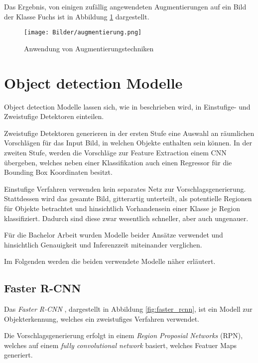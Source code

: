 Das Ergebnis, von einigen zufällig angewendeten Augmentierungen 
auf ein Bild der Klasse Fuchs ist in 
Abbildung \ref{fig:augmentierung} dargestellt.


\begin{figure}[H]
    \centering
    \texttt{[image: Bilder/augmentierung.png]}
    \caption{Anwendung von Augmentierungstechniken}
    \label{fig:augmentierung}
\end{figure}


\section{Object detection Modelle}

Object detection Modelle lassen sich, wie in 
\cite{wuRecentAdvancesDeep2019} beschrieben wird,
in Einstufige- und Zweistufige Detektoren einteilen.

Zweistufige Detektoren generieren in der 
ersten Stufe eine Auswahl an räumlichen Vorschlägen
für das Input Bild, in welchen Objekte enthalten sein 
können. 
In der zweiten Stufe, werden die Vorschläge zur Feature 
Extraction einem CNN übergeben, welches neben 
einer Klassifikation auch einen Regressor für 
die Bounding Box Koordinaten besitzt.

Einstufige Verfahren verwenden kein separates 
Netz zur Vorschlagsgenerierung. Stattdessen 
wird das gesamte Bild, gitterartig unterteilt,
als potentielle Regionen für Objekte betrachtet 
und hinsichtlich Vorhandensein einer Klasse je 
Region klassifiziert.
Dadurch sind diese zwar wesentlich schneller, 
aber auch ungenauer.

Für die Bachelor Arbeit wurden 
Modelle beider Ansätze verwendet und 
hinsichtlich Genauigkeit und 
Inferenzzeit miteinander verglichen.

Im Folgenden werden die beiden 
verwendete Modelle näher erläutert.



\subsection*{Faster R-CNN}

Das \textit{Faster R-CNN} \cite{renFasterRCNNRealTime2016a}, 
dargestellt in Abbildung \ref{fig:faster_rcnn}, 
ist ein Modell zur Objekterkennung, welches
ein zweistufiges Verfahren verwendet.

Die Vorschlagsgenerierung erfolgt in einem 
\textit{Region Proposial Networks} (RPN), welches auf 
einem \textit{fully convolutional network} 
basiert, welches Featuer Maps generiert.

